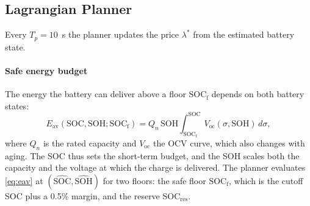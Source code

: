 \subsection{Lagrangian Planner}
\label{sec:method:planner}
\label{sec:method:pricing}

Every $T_p = 10$~s the planner updates the price $\lambda^\ast$ from the estimated battery state.

\paragraph{Safe energy budget}
The energy the battery can deliver above a floor $\mathrm{SOC}_{\mathrm{f}}$ depends on both battery states:
\begin{equation}
  E_{\mathrm{av}}(\mathrm{SOC}, \mathrm{SOH}; \mathrm{SOC}_{\mathrm{f}})
  = Q_n \,\mathrm{SOH} \int_{\mathrm{SOC}_{\mathrm{f}}}^{\mathrm{SOC}}
    V_{\mathrm{oc}}(\sigma, \mathrm{SOH})\, d\sigma,
  \label{eq:eav}
\end{equation}
where $Q_n$ is the rated capacity and $V_{\mathrm{oc}}$ the \ac{OCV} curve, which also
changes with aging. The \ac{SOC} thus sets the short-term budget, and the \ac{SOH} scales
both the capacity and the voltage at which the charge is delivered.
The planner evaluates \eqref{eq:eav} at $(\widehat{\mathrm{SOC}}, \widehat{\mathrm{SOH}})$ for two floors:
the safe floor $\mathrm{SOC}_{\mathrm{f}}$, which is the cutoff \ac{SOC} plus a 0.5\% margin, and the reserve
$\mathrm{SOC}_{\mathrm{res}}$.

